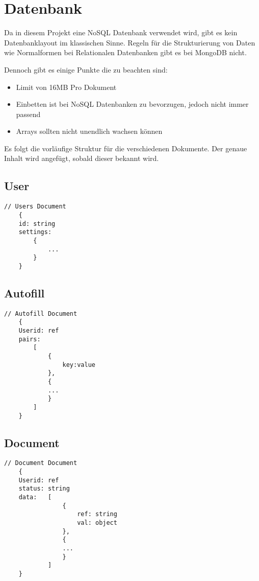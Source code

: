 \chapter{Datenbank}
Da in diesem Projekt eine NoSQL Datenbank verwendet wird, gibt es kein Datenbanklayout im klassischen Sinne.
Regeln für die Strukturierung von Daten wie Normalformen bei Relationalen Datenbanken gibt es bei MongoDB nicht.

Dennoch gibt es einige Punkte die zu beachten sind:
\begin{itemize}
    \item Limit von 16\ac{MB} Pro Dokument
    \item Einbetten ist bei NoSQL Datenbanken zu bevorzugen, jedoch nicht immer passend
    \item Arrays sollten nicht unendlich wachsen können
\end{itemize}

Es folgt die vorläufige Struktur für die verschiedenen Dokumente.
Der genaue Inhalt wird angefügt, sobald dieser bekannt wird.

\section{User}

\begin{lstlisting}[label={lst:lstlistingusers}]
    // Users Document
    {
    id: string
    settings:
        {
            ...
        }
    }

\end{lstlisting}

\section{Autofill}
\begin{lstlisting}[label={lst:lstlistingauto}]
    // Autofill Document
    {
    Userid: ref
    pairs:
        [
            {
                key:value
            },
            {
            ...
            }
        ]
    }

\end{lstlisting}

\section{Document}
\begin{lstlisting}[label={lst:lstlistingdoc}]
    // Document Document
    {
    Userid: ref
    status: string
    data:   [
                {
                    ref: string
                    val: object
                },
                {
                ...
                }
            ]
    }

\end{lstlisting}